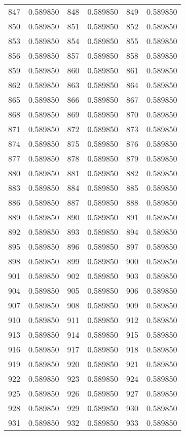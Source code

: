 \documentclass[12pt]{article}
\begin{document}
\begin{longtable}{@{}cc|cc|cc@{}}
847 & 0.589850 & 848 & 0.589850 & 849 & 0.589850 \\
850 & 0.589850 & 851 & 0.589850 & 852 & 0.589850 \\
853 & 0.589850 & 854 & 0.589850 & 855 & 0.589850 \\
856 & 0.589850 & 857 & 0.589850 & 858 & 0.589850 \\
859 & 0.589850 & 860 & 0.589850 & 861 & 0.589850 \\
862 & 0.589850 & 863 & 0.589850 & 864 & 0.589850 \\
865 & 0.589850 & 866 & 0.589850 & 867 & 0.589850 \\
868 & 0.589850 & 869 & 0.589850 & 870 & 0.589850 \\
871 & 0.589850 & 872 & 0.589850 & 873 & 0.589850 \\
874 & 0.589850 & 875 & 0.589850 & 876 & 0.589850 \\
877 & 0.589850 & 878 & 0.589850 & 879 & 0.589850 \\
880 & 0.589850 & 881 & 0.589850 & 882 & 0.589850 \\
883 & 0.589850 & 884 & 0.589850 & 885 & 0.589850 \\
886 & 0.589850 & 887 & 0.589850 & 888 & 0.589850 \\
889 & 0.589850 & 890 & 0.589850 & 891 & 0.589850 \\
892 & 0.589850 & 893 & 0.589850 & 894 & 0.589850 \\
895 & 0.589850 & 896 & 0.589850 & 897 & 0.589850 \\
898 & 0.589850 & 899 & 0.589850 & 900 & 0.589850 \\
901 & 0.589850 & 902 & 0.589850 & 903 & 0.589850 \\
904 & 0.589850 & 905 & 0.589850 & 906 & 0.589850 \\
907 & 0.589850 & 908 & 0.589850 & 909 & 0.589850 \\
910 & 0.589850 & 911 & 0.589850 & 912 & 0.589850 \\
913 & 0.589850 & 914 & 0.589850 & 915 & 0.589850 \\
916 & 0.589850 & 917 & 0.589850 & 918 & 0.589850 \\
919 & 0.589850 & 920 & 0.589850 & 921 & 0.589850 \\
922 & 0.589850 & 923 & 0.589850 & 924 & 0.589850 \\
925 & 0.589850 & 926 & 0.589850 & 927 & 0.589850 \\
928 & 0.589850 & 929 & 0.589850 & 930 & 0.589850 \\
931 & 0.589850 & 932 & 0.589850 & 933 & 0.589850 \\

\end{longtable}
\end{document}
